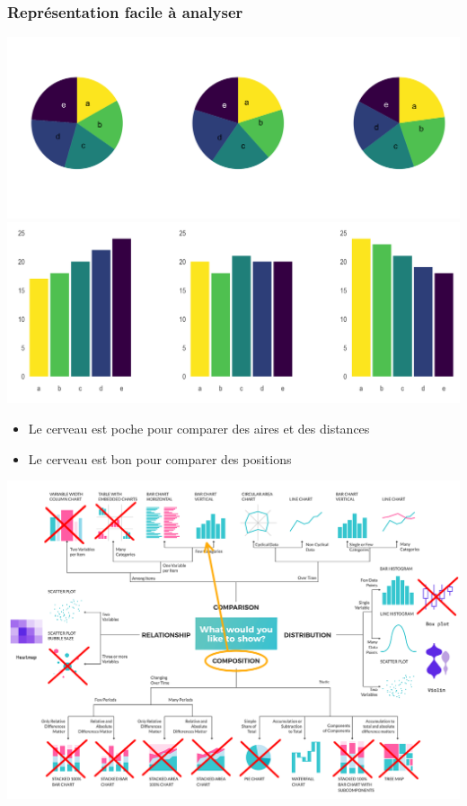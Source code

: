 \documentclass[aspectratio=169]{beamer}
\begin{document}
\begin{frame}[c]\frametitle{Représentation facile à analyser}
    
\vspace{-3mm}

\centering
\onslide<+->
\includegraphics[width=.6\textwidth, trim={2cm 6.2cm 1cm 5cm}, clip]{figures/pie-charts-bad.png}
\onslide<+->
\includegraphics[width=.6\textwidth]{figures/bar-charts-good.png}

\begin{itemize}
	\item<4-> Le cerveau est poche pour comparer des aires et des distances
	\item<4-> Le cerveau est bon pour comparer des positions
\end{itemize}

\end{frame}



\begin{frame}[c]
    
\includegraphics[height=\paperheight]{figures/types_of_charts_sorted.png}

\end{frame}
\end{document}
